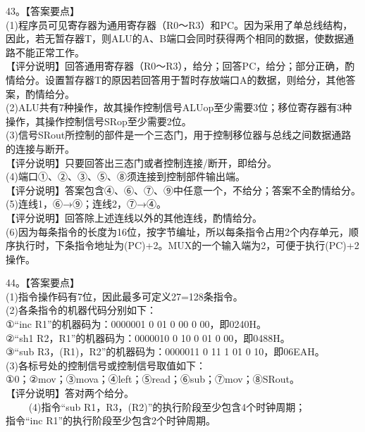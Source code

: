 43。【答案要点】\\
(1)程序员可见寄存器为通用寄存器（R0～R3）和PC。因为采用了单总线结构，因此，若无暂存器T，则ALU的A、B端口会同时获得两个相同的数据，使数据通路不能正常工作。\\
【评分说明】回答通用寄存器（R0～R3），给分；回答PC，给分；部分正确，酌情给分。设置暂存器T的原因若回答用于暂时存放端口A的数据，则给分，其他答案，酌情给分。\\
(2)ALU共有7种操作，故其操作控制信号ALUop至少需要3位；移位寄存器有3种操作，其操作控制信号SRop至少需要2位。\\
(3)信号SRout所控制的部件是一个三态门，用于控制移位器与总线之间数据通路的连接与断开。\\
【评分说明】只要回答出三态门或者控制连接/断开，即给分。\\(4)端口①、②、③、⑤、⑧须连接到控制部件输出端。\\
【评分说明】答案包含④、⑥、⑦、⑨中任意一个，不给分；答案不全酌情给分。\\
(5)连线1，⑥→⑨；连线2，⑦→④。\\
【评分说明】回答除上述连线以外的其他连线，酌情给分。\\
(6)因为每条指令的长度为16位，按字节编址，所以每条指令占用2个内存单元，顺序执行时，下条指令地址为(PC)+2。MUX的一个输入端为2，可便于执行(PC)+2操作。

44。【答案要点】\\
(1)指令操作码有7位，因此最多可定义27=128条指令。\\
(2)各条指令的机器代码分别如下：\\
①“inc R1”的机器码为：0000001 0 01 0 00 0 00，即0240H。\\
②“sh1 R2，R1”的机器码为：0000010 0 10 0 01 0 00，即0488H。\\
③“sub R3，(R1)，R2”的机器码为：0000011 0 11 1 01 0 10，即06EAH。\\
(3)各标号处的控制信号或控制信号取值如下：\\
①0；②mov；③mova；④left；⑤read；⑥sub；⑦mov；⑧SRout。\\
【评分说明】答对两个给分。\\
$\qquad$ (4)指令“sub R1，R3，(R2)”的执行阶段至少包含4个时钟周期；\\
指令“inc R1”的执行阶段至少包含2个时钟周期。

